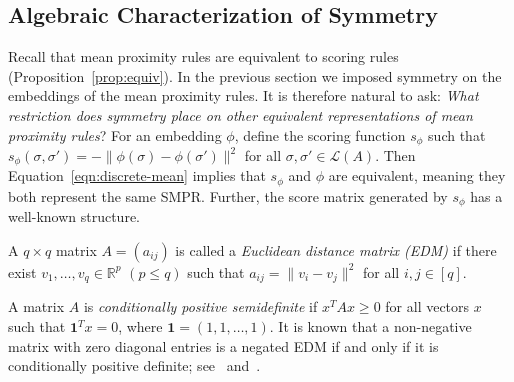 \documentclass[prodmode,acmec]{ec-acmsmall}
\newcommand{\calL}{{\mathcal{L}}}
\newcommand{\rank}{{\calL(A)}}
\newcommand{\ones}{\mathbf{1}}
\begin{document}
%




\subsection{Algebraic Characterization of Symmetry}
\label{sec:smpr-char}

Recall that mean proximity rules are equivalent to scoring rules (Proposition~\ref{prop:equiv}). In the previous section we imposed symmetry on the embeddings of the mean proximity rules. It is therefore natural to ask: \emph{What restriction does symmetry place on other equivalent representations of mean proximity rules}? For an embedding $\phi$, define the scoring function $s_{\phi}$ such that $s_{\phi}(\sigma,\sigma') = -\|\phi(\sigma)-\phi(\sigma')\|^2$ for all $\sigma,\sigma' \in \rank$. Then Equation~\eqref{eqn:discrete-mean} implies that $s_{\phi}$ and $\phi$ are equivalent, meaning they both represent the same SMPR. Further, the score matrix generated by $s_{\phi}$ has a well-known structure.


\begin{definition}
A $q \times q$ matrix $A = (a_{ij})$ is called a \emph{Euclidean distance matrix (EDM)} if there exist $v_1,\ldots,v_q \in \mathbb{R}^p$ $(p \leq q)$ such that $a_{ij} = \|v_i-v_j\|^2$ for all $i,j \in [q]$. 
\end{definition}
%
A matrix $A$ is \emph{conditionally positive semidefinite} if $x^T A x \geq 0$ for all vectors $x$ such that $\ones^T x = 0$, where $\ones = (1,1,\ldots,1)$. It is known that a non-negative matrix with zero diagonal entries is a negated EDM if and only if it is conditionally positive definite; see~\cite[Thm 3.10]{ikramov2000conditionally} and~\cite{schoenberg1938metric}.
\end{document}
